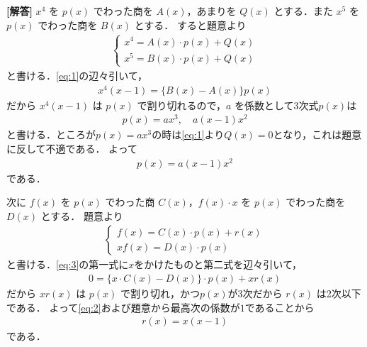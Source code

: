 \documentclass[../../main.tex]{subfiles}
\begin{document}
\begin{oframed}
  
\end{oframed}

{\bf [解答]}
$x^4$ を $p(x)$ でわった商を $A(x)$，あまりを $Q(x)$ とする．また $x^5$ を $p(x)$ でわった商を $B(x)$ とする．
すると題意より
\begin{align}
  \begin{cases}
    x^4=A(x)\cdot p(x)+Q(x) \\
    x^5=B(x)\cdot p(x)+Q(x)
  \end{cases} \label{eq:1}
\end{align}
と書ける．\cref{eq:1}の辺々引いて，
\begin{align}
  x^4(x-1)=\{B(x)-A(x)\}p(x)
\end{align}
だから $x^4(x-1)$ は $p(x)$ で割り切れるので，$a$ を係数として3次式$p(x)$は
\begin{align}
  p(x)=ax^3, \quad a(x-1) x^2
\end{align}
と書ける．ところが$p(x)=ax^3$の時は\cref{eq:1}より$Q(x)=0$となり，これは題意に反して不適である．
よって
\begin{align}
  p(x)=a(x-1) x^2 \label{eq:2}
\end{align}
である．

次に $f(x)$ を $p(x)$ でわった商 $C(x)$，$f(x)\cdot x$ を $p(x)$ でわった商を $D(x)$ とする．
題意より
\begin{align}
  \begin{cases}
    f(x)=C(x)\cdot p(x)+r(x) \\
    xf(x)=D(x)\cdot p(x)
  \end{cases} \label{eq:3}
\end{align}
と書ける．\cref{eq:3}の第一式に$x$をかけたものと第二式を辺々引いて，
\begin{align}
  0=\{x\cdot C(x)-D(x)\}\cdot p(x)+xr(x)
\end{align}
だから $xr(x)$ は $p(x)$ で割り切れ，かつ$p(x)$が3次だから $r(x)$ は2次以下である．
よって\cref{eq:2}および題意から最高次の係数が$1$であることから
\begin{align}
  r(x)=x(x-1)
\end{align}
である．

\newpage
\end{document}
